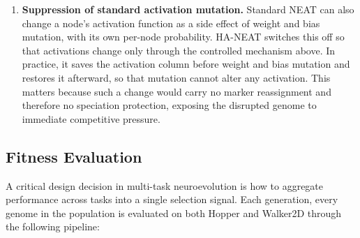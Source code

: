 \documentclass[12pt]{article}
\begin{document}
\begin{enumerate}
    \item \textbf{Suppression of standard activation mutation.} Standard NEAT can also change a node's activation function as a side effect of weight and bias mutation, with its own per-node probability. HA-NEAT switches this off so that activations change only through the controlled mechanism above. In practice, it saves the activation column before weight and bias mutation and restores it afterward, so that mutation cannot alter any activation. This matters because such a change would carry no marker reassignment and therefore no speciation protection, exposing the disrupted genome to immediate competitive pressure.
\end{enumerate}


\subsection{Fitness Evaluation}
\label{subsec:fitness-evaluation}

A critical design decision in multi-task neuroevolution is how to aggregate performance across tasks into a single selection signal.
Each generation, every genome in the population is evaluated on both Hopper and Walker2D through the following pipeline:
\end{document}
